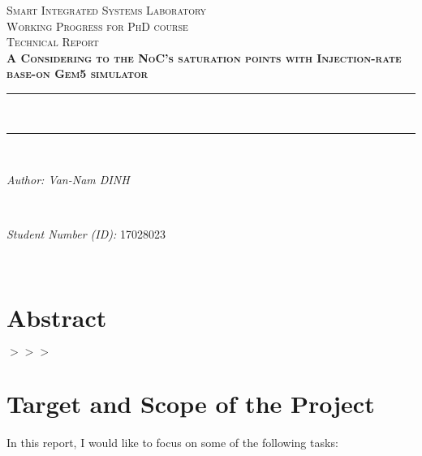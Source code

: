 \documentclass[13pt]{article}
\author{Linus C. Brendel}								%
\date{\today}											%
\begin{document}
	

\begin{titlepage}
	\centering
	\vspace*{0.5 cm}
	\textsc{\LARGE Smart Integrated Systems Laboratory}\\[1.0 cm]	%
	\textsc{\Large Working Progress for PhD course}\\[0.5 cm]				%
	\textsc{\large Technical Report}\\[0.5 cm]				%
	\textsc{\textbf{A Considering to the NoC's saturation points with Injection-rate base-on Gem5 simulator}}
	\rule{\linewidth}{0.2 mm} \\[0.4 cm]
	\rule{\linewidth}{0.2 mm} \\[1.5 cm]
	
	\begin{minipage}{0.4\textwidth}
		\begin{flushleft} \large
			\emph{Author: Van-Nam DINH}\\
		\end{flushleft}
	\end{minipage}~
	\begin{minipage}{0.4\textwidth}
		\begin{flushright} \large
			\emph{Student Number (ID):} 17028023									%
		\end{flushright}
	\end{minipage}\\[2 cm]
	
	
	\vfill
	
\end{titlepage}
	
	\tableofcontents
	\pagebreak
	

\section*{Abstract}
	$>>>$
	
		
\section{Target and Scope of the Project}
	In this report, I would like to focus on some of the following tasks:
	
\end{document}
